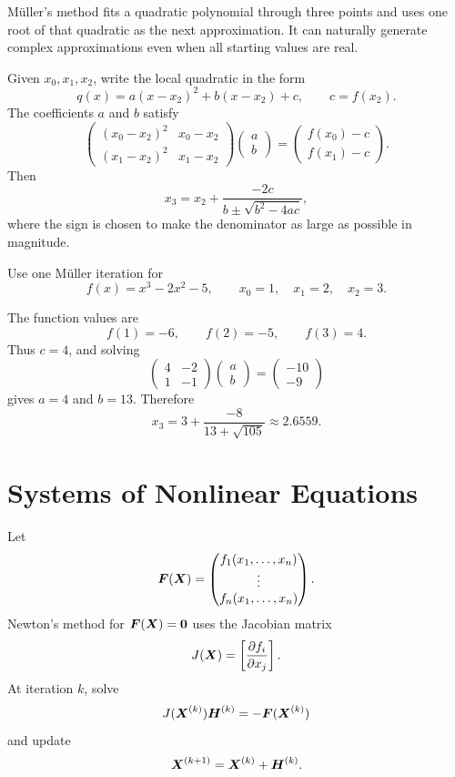 Müller's method fits a quadratic polynomial through three points and uses one root of that quadratic as the next approximation.  It can naturally generate complex approximations even when all starting values are real.

Given $x_0,x_1,x_2$, write the local quadratic in the form
\[
 q(x)=a(x-x_2)^2+b(x-x_2)+c,
 \qquad c=f(x_2).
\]
The coefficients $a$ and $b$ satisfy
\[
\begin{pmatrix}
(x_0-x_2)^2&x_0-x_2\\
(x_1-x_2)^2&x_1-x_2
\end{pmatrix}
\begin{pmatrix}a\\b\end{pmatrix}
=
\begin{pmatrix}f(x_0)-c\\f(x_1)-c\end{pmatrix}.
\]
Then
\[
 x_3=x_2+\frac{-2c}{b\pm\sqrt{b^2-4ac}},
\]
where the sign is chosen to make the denominator as large as possible in magnitude.

\begin{example}
Use one Müller iteration for
\[
 f(x)=x^3-2x^2-5,
 \qquad x_0=1,
 \quad x_1=2,
 \quad x_2=3.
\]
\end{example}

\begin{solution}[5.0cm]
The function values are
\[
 f(1)=-6,
 \qquad f(2)=-5,
 \qquad f(3)=4.
\]
Thus $c=4$, and solving
\[
\begin{pmatrix}4&-2\\1&-1\end{pmatrix}
\begin{pmatrix}a\\b\end{pmatrix}
=
\begin{pmatrix}-10\\-9\end{pmatrix}
\]
gives $a=4$ and $b=13$.  Therefore
\[
 x_3=3+\frac{-8}{13+\sqrt{105}}
 \approx2.6559.
\]
\end{solution}

\section{Systems of Nonlinear Equations}

Let
\[
 \boldsymbol{F}(\boldsymbol{X})=
 \begin{pmatrix}
 f_1(x_1,\ldots,x_n)\\
 \vdots\\
 f_n(x_1,\ldots,x_n)
 \end{pmatrix}.
\]
Newton's method for $\boldsymbol{F}(\boldsymbol{X})=\boldsymbol{0}$ uses the Jacobian matrix
\[
 J(\boldsymbol{X})=
 \left[\frac{\partial f_i}{\partial x_j}\right].
\]
At iteration $k$, solve
\[
 J(\boldsymbol{X}^{(k)})\boldsymbol{H}^{(k)}
 =-\boldsymbol{F}(\boldsymbol{X}^{(k)})
\]
and update
\[
 \boldsymbol{X}^{(k+1)}=\boldsymbol{X}^{(k)}+\boldsymbol{H}^{(k)}.
\]

